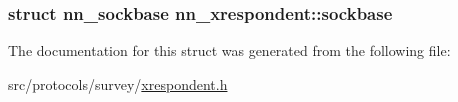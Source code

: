 \subsubsection[{sockbase}]{\setlength{\rightskip}{0pt plus 5cm}struct {\bf nn\+\_\+sockbase} nn\+\_\+xrespondent\+::sockbase}\hypertarget{structnn__xrespondent_a9d4a5e23b78a1dbb272cf42f414ec7e6}{}\label{structnn__xrespondent_a9d4a5e23b78a1dbb272cf42f414ec7e6}


The documentation for this struct was generated from the following file\+:\begin{DoxyCompactItemize}
\item 
src/protocols/survey/\hyperlink{xrespondent_8h}{xrespondent.\+h}\end{DoxyCompactItemize}

